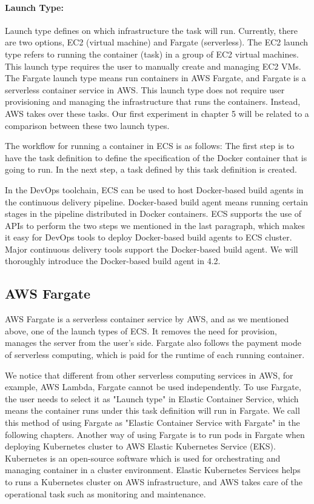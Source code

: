\paragraph{Launch Type:} Launch type defines on which infrastructure the task will run. Currently, there are two options, EC2 (virtual machine) and Fargate (serverless). The EC2 launch type refers to running the container (task) in a group of EC2 virtual machines. This launch type requires the user to manually create and managing EC2 VMs. The Fargate launch type means run containers in AWS Fargate, and Fargate is a serverless container service in AWS. This launch type does not require user provisioning and managing the infrastructure that runs the containers. Instead, AWS takes over these tasks. Our first experiment in chapter 5 will be related to a comparison between these two launch types.
\par
The workflow for running a container in ECS is as follows:
The first step is to have the task definition to define the specification of the Docker container that is going to run. In the next step, a task defined by this task definition is created.
\par
In the DevOps toolchain, ECS can be used to host Docker-based build agents in the continuous delivery pipeline. Docker-based build agent means running certain stages in the pipeline distributed in Docker containers. 
ECS supports the use of APIs to perform the two steps we mentioned in the last paragraph, which makes it easy for DevOps tools to deploy Docker-based build agents to ECS cluster.
Major continuous delivery tools support the Docker-based build agent. 
We will thoroughly introduce the Docker-based build agent in 4.2.
\subsection{AWS Fargate}
AWS Fargate is a serverless container service by AWS, and as we mentioned above, one of the launch types of ECS. It removes the need for provision, manages the server from the user's side. Fargate also follows the payment mode of serverless computing, which is paid for the runtime of each running container. 
\par
We notice that different from other serverless computing services in AWS, for example, AWS Lambda, Fargate cannot be used independently. To use Fargate, the user needs to select it as "Launch type" in Elastic Container Service, which means the container runs under this task definition will run in Fargate. We call this method of using Fargate as "Elastic Container Service with Fargate" in the following chapters. Another way of using Fargate is to run pods in Fargate when deploying Kubernetes cluster to AWS Elastic Kubernetes Service (EKS). Kubernetes is an open-source software which is used for orchestrating and managing container in a cluster environment. Elastic Kubernetes Services helps to runs a Kubernetes cluster on AWS infrastructure, and AWS takes care of the operational task such as monitoring and maintenance. 
